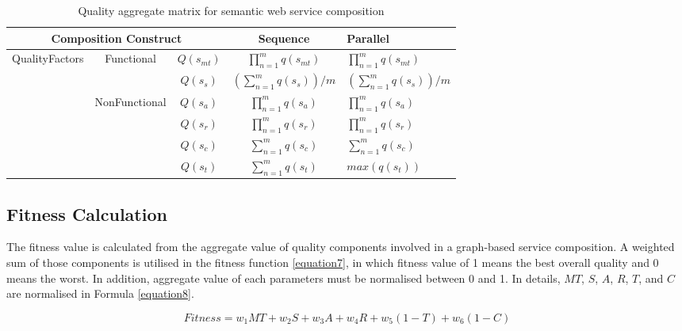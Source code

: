 \documentclass{llncs}
\begin{document}
\begin{table}[]
\centering
\caption{Quality aggregate matrix for semantic web service composition}
\label{table1}
\begin{tabular}{|c|c|c|c|l|}
\hline
\multicolumn{3}{|c|}{Composition Construct}                                      & Sequence                             & Parallel \\ \hline
\multirow{5}{*}{QualityFactors} & \multirow{2}{*}{Functional}    & $Q(s_ {mt})$  &$\prod_{n=1}^{m} q(s_ {mt})$          &  $\prod_{n=1}^{m} q(s_ {mt})$ \\ \cline{3-5}
                                &                                & $Q(s_ {s})$  & $(\sum_{n=1}^m q(s_ {s}))/m$        &  $(\sum_{n=1}^m q(s_ {s}))/m$  \\ \cline{2-5}   
                                & \multirow{4}{*}{NonFunctional} & $Q(s_{a})$    & $\prod_{n=1}^{m} q(s_a)$             &  $\prod_{n=1}^{m} q(s_a)$ \\ \cline{3-5} 
                                &                                & $Q(s_{r})$    & $\prod_{n=1}^{m} q(s_r)$             &  $\prod_{n=1}^{m} q(s_r)$ \\ \cline{3-5} 
                                &                                & $Q(s_{c})$    & $\sum_{n=1}^m q(s_ {c})$             &  $\sum_{n=1}^m q(s_ {c})$ \\ \cline{3-5} 
                                &                                & $Q(s_{t})$    & $\sum_{n=1}^m q(s_ {t})$             &  $max(q(s_ {t}))$ \\ \hline
\end{tabular}
\end{table}

\subsection{Fitness Calculation}
The fitness value is calculated from the aggregate value of quality components involved in a graph-based service composition. A weighted sum of those components is utilised in the fitness function \ref{equation7}, in which fitness value of 1 means the best overall quality and 0 means the worst. In addition, aggregate value of each parameters must be normalised between 0 and 1. In details, $MT$, $S$, $A$, $R$, $T$, and $C$ are normalised in Formula \ref{equation8}.


\begin{equation}
\label{equation7}
Fitness = w_1MT + w_2S + w_3A + w_4R + w_5(1 - T) + w_6(1 - C)
\end{equation}
\end{document}
